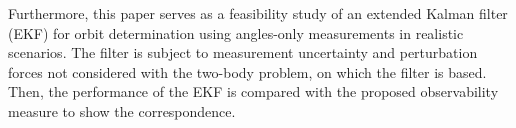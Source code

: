\documentclass[letterpaper, preprint, paper,11pt]{AAS}	%
\begin{document}
Furthermore, this paper serves as a feasibility study of an extended Kalman filter (EKF) for orbit determination using angles-only measurements in realistic scenarios. The filter is subject to measurement uncertainty and perturbation forces not considered with the two-body problem, on which the filter is based.
Then, the performance of the EKF is compared with the proposed observability measure to show the correspondence. 



 




\end{document}

